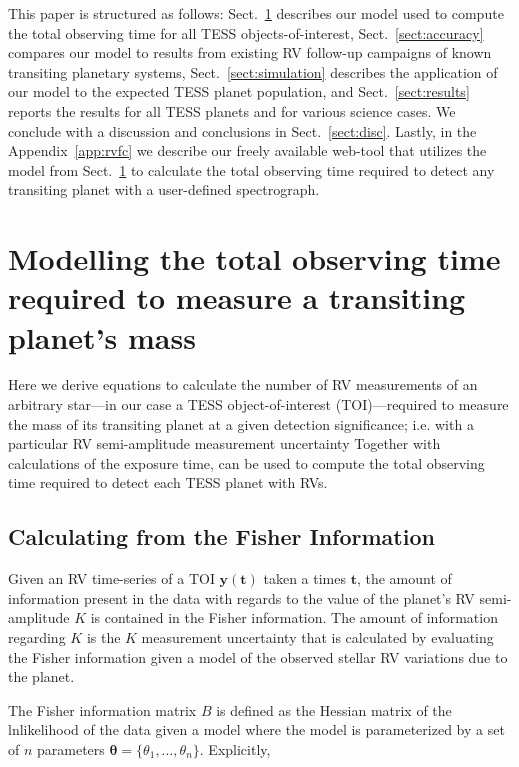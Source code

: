 This paper is structured as follows: Sect.~\ref{sect:model} describes our model used to compute the
total observing time for all TESS objects-of-interest, Sect.~\ref{sect:accuracy} compares our model to
results from existing RV follow-up campaigns of known transiting planetary systems,
Sect.~\ref{sect:simulation} describes the application of our model to the expected
TESS planet population, and Sect.~\ref{sect:results} reports the results for all TESS planets and for
various science cases. We conclude with a discussion and conclusions in Sect.~\ref{sect:disc}. 
Lastly, in the Appendix~\ref{app:rvfc}
we describe our freely available web-tool that utilizes the model from Sect.~\ref{sect:model}
to calculate the total observing time required to detect any transiting planet with a
user-defined spectrograph.


\section{Modelling the total observing time required to measure a transiting planet's mass} \label{sect:model}
Here we derive equations to calculate the number of RV measurements \nrv{,}
of an arbitrary star---in our case a TESS object-of-interest (TOI)---required to measure the mass of
its transiting planet at a given
detection significance; i.e. with a particular RV semi-amplitude measurement uncertainty 
Together with calculations of the exposure time, \nrv{} can be used to
compute the total observing time required to detect each TESS planet with RVs.

\subsection{Calculating \sigK{} from the Fisher Information} \label{sect:fisher}
Given an RV time-series of a TOI $\mathbf{y}(\mathbf{t})$ taken a times $\mathbf{t}$,
the amount of information present in the data with regards to the value of
the planet's RV semi-amplitude $K$ is contained in the Fisher information. The amount of
information regarding $K$ is the $K$ measurement uncertainty \sigK{,} that is calculated by
evaluating the Fisher information given a model of the observed stellar RV variations due to the
planet.

The Fisher
information matrix $B$ is defined as the Hessian matrix of the lnlikelihood of the data given a model
where the model is parameterized by a set of $n$ parameters $\boldsymbol{\theta}=\{\theta_1,\dots,\theta_n\}$.
Explicitly,

